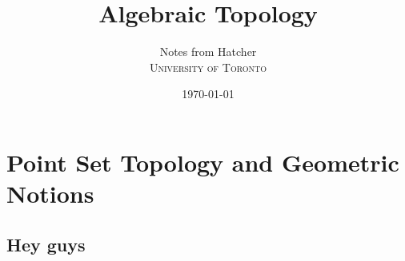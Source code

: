 \documentclass[12pt]{article}
\title{Algebraic Topology}
\author{
Notes from Hatcher\\
\textsc{University of Toronto}
}
\date{\today}
\begin{document}
\begin{titlingpage}
\maketitle
\end{titlingpage}
\tableofcontents
\newpage

\section{Point Set Topology and Geometric Notions}

\subsection{Hey guys}
\end{document}
